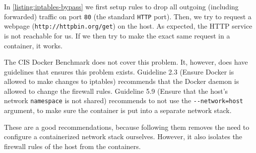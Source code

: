 In \autoref{listing:iptables-bypass} we first setup rules to drop all outgoing (including forwarded) traffic on port \lstinline{80} (the standard \lstinline{HTTP} port). Then, we try to request a webpage (\lstinline{http://httpbin.org/get}) on the host. As expected, the HTTP service is not reachable for us. If we then try to make the exact same request in a container, it works.

\medskip

The CIS Docker Benchmark does not cover this problem. It, however, does have guidelines that ensures this problem exists. Guideline 2.3 (Ensure Docker is allowed to make changes to iptables) recommends that the Docker daemon is allowed to change the firewall rules. Guideline 5.9 (Ensure that the host's network \lstinline{namespace} is not shared) recommends to not use the \lstinline{--network=host} argument, to make sure the container is put into a separate network stack.

These are a good recommendations, because following them removes the need to configure a containerized network stack ourselves. However, it also isolates the firewall rules of the host from the containers.
